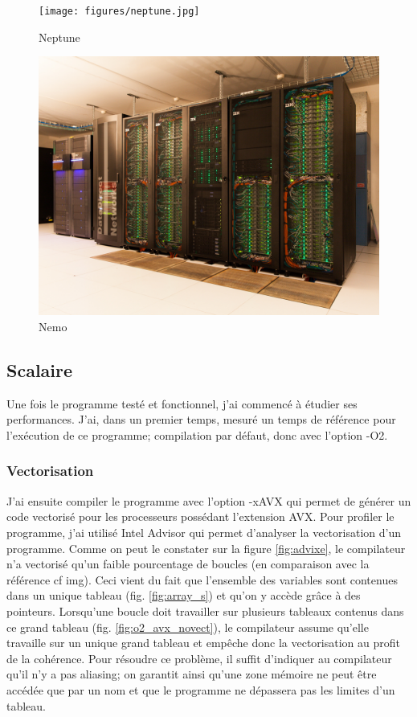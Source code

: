 \begin{figure}[ht]
  \centering
  \begin{minipage}{.5\textwidth}
    \centering
    \texttt{[image: figures/neptune.jpg]}
    \caption{\label{fig:neptune}Neptune}
  \end{minipage}%
  \begin{minipage}{.5\textwidth}
    \centering
    \includegraphics[width=.9\linewidth]{figures/nemo.jpg}
    \caption{\label{fig:neptune_node}Nemo}
  \end{minipage}
\end{figure}



\subsection{Scalaire}
Une fois le programme testé et fonctionnel, j'ai commencé à étudier ses performances. J'ai, dans un premier temps, mesuré un temps de référence pour l'exécution de ce programme; compilation par défaut, donc avec l'option -O2.

\subsubsection{Vectorisation}
J'ai ensuite compiler le programme avec l'option -xAVX qui permet de générer un code vectorisé pour les processeurs possédant l'extension AVX. Pour profiler le programme, j'ai utilisé Intel Advisor qui permet d'analyser la vectorisation d'un programme. Comme on peut le constater sur la figure \ref{fig:advixe}, le compilateur n'a vectorisé qu'un faible pourcentage de boucles (en comparaison avec la référence cf img). Ceci vient du fait que l'ensemble des variables sont contenues dans un unique tableau (fig. \ref{fig:array_s}) et qu'on y accède grâce à des pointeurs. Lorsqu'une boucle doit travailler sur plusieurs tableaux contenus dans ce grand tableau (fig. \ref{fig:o2_avx_novect}), le compilateur assume qu'elle travaille sur un unique grand tableau et empêche donc la vectorisation au profit de la cohérence. Pour résoudre ce problème, il suffit d'indiquer au compilateur qu'il n'y a pas aliasing; on garantit ainsi qu'une zone mémoire ne peut être accédée que par un nom et que le programme ne dépassera pas les limites d'un tableau.


